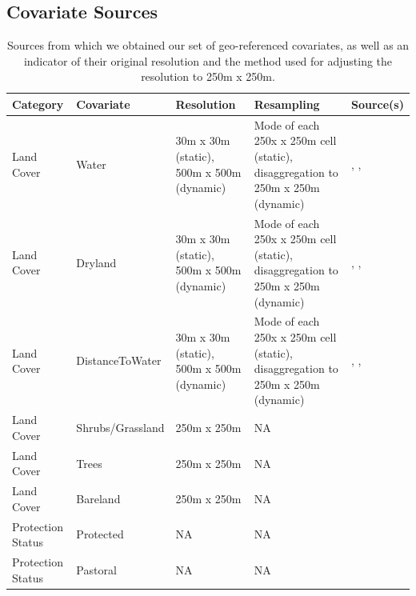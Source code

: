 \documentclass[abstract=on,10pt,a4paper,bibliography=totocnumbered]{scrartcl}
\begin{document}
\newpage
\subsection{Covariate Sources}
\label{Appendix:Sources}
\begin{table}[h]
  \begin{center}
    \caption{Sources from which we obtained our set of geo-referenced
    covariates, as well as an indicator of their original resolution and the
    method used for adjusting the resolution to 250m x 250m.}
    \label{Sources}
    \resizebox{\textwidth}{!} {
      \begin{tabular}{llp{4cm}p{4cm}p{7cm}}
      \hline
      \textbf{Category} &
        \textbf{Covariate} &
          \textbf{Resolution} &
            \textbf{Resampling} &
              \textbf{Source(s)} \\
      \midrule
      Land Cover
        & Water
          & 30m x 30m (static), 500m x 500m (dynamic)
            & Mode of each 250x x 250m cell (static), disaggregation to 250m x 250m (dynamic)
              & \cite{Chen.2015}, \cite{Schaaf.2015}, \cite{Yamazaki.2019} \\
      Land Cover
        & Dryland
          & 30m x 30m (static), 500m x 500m (dynamic)
            & Mode of each 250x x 250m cell (static), disaggregation to 250m x 250m (dynamic)
              & \cite{Chen.2015}, \cite{Schaaf.2015}, \cite{Yamazaki.2019} \\
      Land Cover
        & DistanceToWater
          & 30m x 30m (static), 500m x 500m (dynamic)
            & Mode of each 250x x 250m cell (static), disaggregation to 250m x 250m (dynamic)
              & \cite{Chen.2015}, \cite{Schaaf.2015}, \cite{Yamazaki.2019} \\
      Land Cover
        & Shrubs/Grassland
          & 250m x 250m
            & NA
              & \cite{Dimiceli.2015} \\
      Land Cover
        & Trees
          & 250m x 250m
            & NA
              & \cite{Dimiceli.2015} \\
      Land Cover
        & Bareland
          & 250m x 250m
            & NA
              & \cite{Dimiceli.2015} \\
      \hdashline
      Protection Status
        & Protected
          & NA
            & NA
              & \cite{PeaceParks.2019} \\
      Protection Status
        & Pastoral
          & NA
            & NA
              & \cite{PeaceParks.2019} \\

\end{tabular}}
\end{center}
\end{table}
\end{document}
